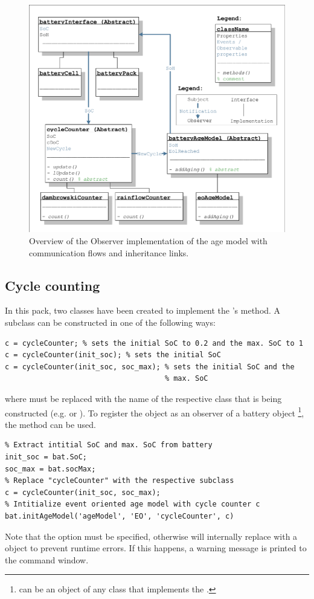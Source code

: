 \begin{figure}[t!]
	\captionsetup{type=figure}
	\centering
	\includegraphics[width=\textwidth]{observer_schema.pdf}
	\caption[Overview of the Observer implementation of the age model with communication flows and inheritance links]{Overview of the Observer implementation of the age model with communication flows and inheritance links.}
	\label{fig:observer_schema}
\end{figure}

\subsection{Cycle counting}
In this pack, two classes have been created to implement the 's  method.
A  subclass can be constructed in one of the following ways:
\begin{lstlisting}
c = cycleCounter; % sets the initial SoC to 0.2 and the max. SoC to 1
c = cycleCounter(init_soc); % sets the initial SoC
c = cycleCounter(init_soc, soc_max); % sets the initial SoC and the
									 % max. SoC
\end{lstlisting}
where  must be replaced with the name of the respective class that is being constructed (e.g.  or ). To register the object as an observer of a battery object \footnote{ can be an object of any class that implements the .}, the  method can be used.
\begin{lstlisting}
% Extract intitial SoC and max. SoC from battery
init_soc = bat.SoC;
soc_max = bat.socMax;
% Replace "cycleCounter" with the respective subclass
c = cycleCounter(init_soc, soc_max);
% Intitialize event oriented age model with cycle counter c
bat.initAgeModel('ageModel', 'EO', 'cycleCounter', c)
\end{lstlisting}
Note that the  option must be specified, otherwise  will internally replace  with a  object to prevent runtime errors. If this happens, a warning message is printed to the command window.


